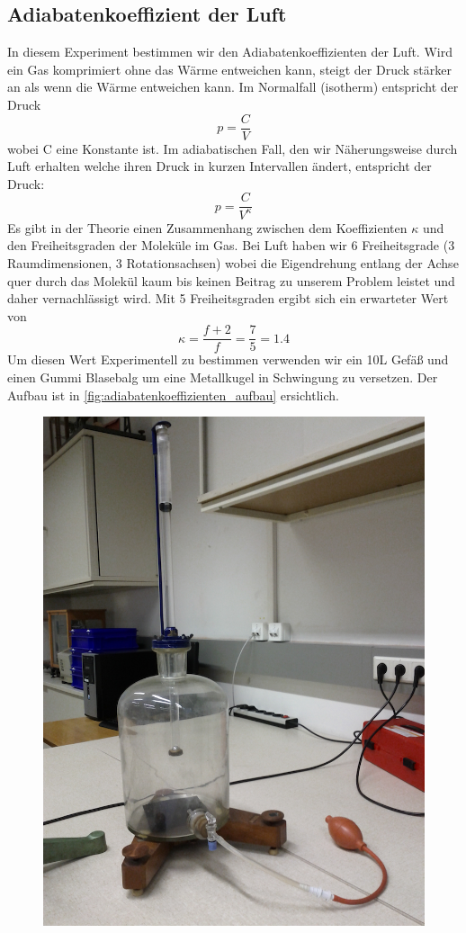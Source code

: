 \documentclass[12pt,a4paper]{article}
\begin{document}
\begin{multicols}{2}
\section{Adiabatenkoeffizient der Luft}
In diesem Experiment bestimmen wir den Adiabatenkoeffizienten der Luft. Wird ein Gas komprimiert ohne das Wärme entweichen kann, steigt der Druck stärker an als wenn die Wärme entweichen kann. Im Normalfall (isotherm) entspricht der Druck
$$p = \frac{C}{V}$$
wobei C eine Konstante ist.
Im adiabatischen Fall, den wir Näherungsweise durch Luft erhalten welche ihren Druck in kurzen Intervallen ändert, entspricht der Druck:
$$p = \frac{C}{V^\kappa}$$
Es gibt in der Theorie einen Zusammenhang zwischen dem Koeffizienten $\kappa$ und den Freiheitsgraden der Moleküle im Gas. Bei Luft haben wir 6 Freiheitsgrade (3 Raumdimensionen, 3 Rotationsachsen) wobei die Eigendrehung entlang der Achse quer durch das Molekül kaum bis keinen Beitrag zu unserem Problem leistet und daher vernachlässigt wird. Mit 5 Freiheitsgraden ergibt sich ein erwarteter Wert von
$$\kappa = \frac{f+2}{f} = \frac{7}{5} = 1.4$$
Um diesen Wert Experimentell zu bestimmen verwenden wir ein 10L Gefäß und einen Gummi Blasebalg um eine Metallkugel in Schwingung zu versetzen. Der Aufbau ist in \ref{fig:adiabatenkoeffizienten_aufbau} ersichtlich.
\begin{figure}[H]
	\centering
	\includegraphics[scale=0.25]{./figure/koeffizient.png}

\end{figure}
\end{multicols}
\end{document}

